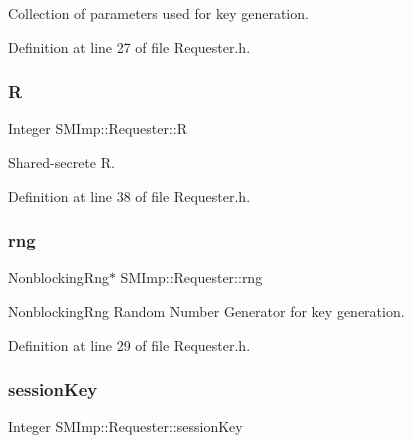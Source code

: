 Collection of parameters used for key generation. 



Definition at line 27 of file Requester.\+h.

\mbox{\label{classSMImp_1_1Requester_ac5f95176425aabf5fa3fb4bb8d152167}} 
\subsubsection{\texorpdfstring{R}{R}}
{\footnotesize\ttfamily Integer S\+M\+Imp\+::\+Requester\+::R}



Shared-\/secrete R. 



Definition at line 38 of file Requester.\+h.

\mbox{\label{classSMImp_1_1Requester_aafd8f13c137f7372eda2e4f781048402}} 
\subsubsection{\texorpdfstring{rng}{rng}}
{\footnotesize\ttfamily Nonblocking\+Rng$\ast$ S\+M\+Imp\+::\+Requester\+::rng}



Nonblocking\+Rng Random Number Generator for key generation. 



Definition at line 29 of file Requester.\+h.

\mbox{\label{classSMImp_1_1Requester_a95d364e3698162c3d3f2502da572bc23}} 
\subsubsection{\texorpdfstring{session\+Key}{sessionKey}}
{\footnotesize\ttfamily Integer S\+M\+Imp\+::\+Requester\+::session\+Key}



